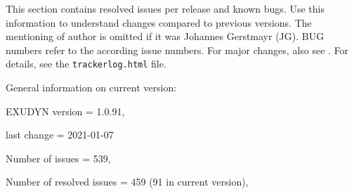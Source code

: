 %
This section contains resolved issues per release and known bugs. Use this information to understand changes compared to previous versions. The mentioning of author is omitted if it was Johannes Gerstmayr (JG).
BUG numbers refer to the according issue numbers.
For major changes, also see . For details, see the \texttt{trackerlog.html} file.




\noindent General information on current version:
\bi \small
  \item EXUDYN version = 1.0.91, 
  \item last change =  2021-01-07

  \item Number of issues = 539, 
  \item Number of resolved issues = 459 (91 in current version), 
\ei

